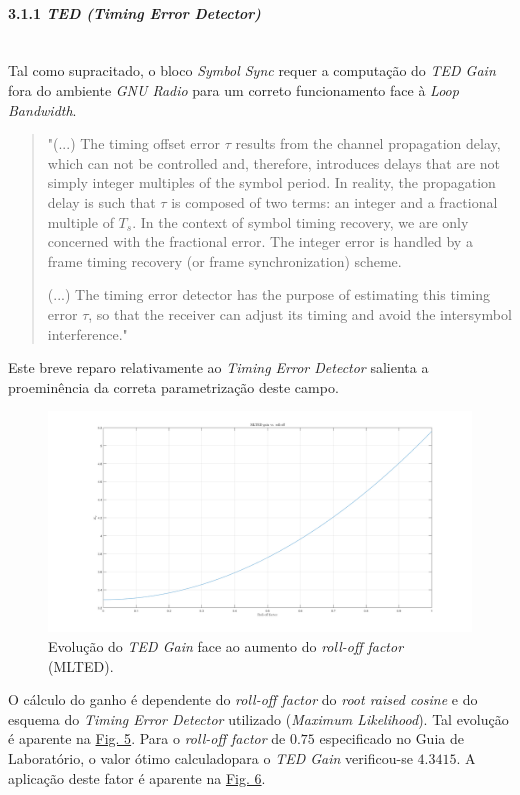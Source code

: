 \paragraph{3.1.1 \textit{TED (Timing Error Detector)}}\mbox{}\\
\label{subsubsubsec:loopbandwidth}
Tal como supracitado, o bloco \textit{Symbol Sync} requer a computação do \textit{TED Gain} fora do ambiente \textit{GNU Radio} para um correto funcionamento face à \textit{Loop Bandwidth}.

\begin{quote}
"(...) The timing offset error $\tau$ results from the channel propagation delay, which can not be controlled and, therefore, introduces delays that are not simply integer multiples of the symbol period. In reality, the propagation delay is such that $\tau$ is composed of two terms: an integer and a fractional multiple of $T_s$. In the context of symbol timing recovery, we are only concerned with the fractional error. The integer error is handled by a frame timing recovery (or frame synchronization) scheme.

(...) The timing error detector has the purpose of estimating this timing error $\tau$, so that the receiver can adjust its timing and avoid the intersymbol interference."\cite{igor}
\end{quote}

Este breve reparo relativamente ao \textit{Timing Error Detector} salienta a proeminência da correta parametrização deste campo.

\begin{figure}[ht]
    \centering
    \includegraphics[width=0.85\linewidth]{img/intro/MLTEDgain.png}
    \caption{Evolução do \textit{TED Gain} face ao aumento do \textit{roll-off factor} (MLTED)\cite{igor}.} 
    \label{fig:TEDGain} 
\end{figure} 

O cálculo do ganho é dependente do \textit{roll-off factor} do \textit{root raised cosine} e do esquema do \textit{Timing Error Detector} utilizado (\textit{Maximum Likelihood}). Tal evolução é aparente na \hyperref[fig:TEDGain]{Fig. 5}. Para o \textit{roll-off factor} de $0.75$ especificado no Guia de Laboratório, o valor ótimo calculado\footnotemark[5] para o \textit{TED Gain} verificou-se $4.3415$. A aplicação deste fator é aparente na \hyperref[fig:TEDGain-effect]{Fig. 6}.

